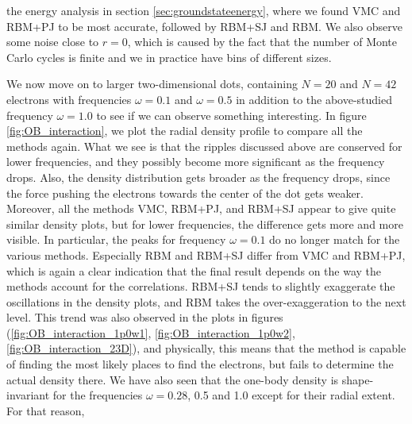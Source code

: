 \noindent
the energy analysis in section \ref{sec:groundstateenergy}, where we found VMC and RBM+PJ to be most accurate, followed by RBM+SJ and RBM. We also observe some noise close to $r=0$, which is caused by the fact that the number of Monte Carlo cycles is finite and we in practice have bins of different sizes.

We now move on to larger two-dimensional dots, containing $N=20$ and $N=42$ electrons with frequencies $\omega=0.1$ and $\omega=0.5$ in addition to the above-studied frequency $\omega=1.0$ to see if we can observe something interesting. In figure \eqref{fig:OB_interaction}, we plot the radial density profile to compare all the methods again. What we see is that the ripples discussed above are conserved for lower frequencies, and they possibly become more significant as the frequency drops. Also, the density distribution gets broader as the frequency drops, since the force pushing the electrons towards the center of the dot gets weaker. Moreover, all the methods VMC, RBM+PJ, and RBM+SJ appear to give quite similar density plots, but for lower frequencies, the difference gets more and more visible. In particular, the peaks for frequency $\omega=0.1$ do no longer match for the various methods. Especially RBM and RBM+SJ differ from VMC and RBM+PJ, which is again a clear indication that the final result depends on the way the methods account for the correlations. RBM+SJ tends to slightly exaggerate the oscillations in the density plots, and RBM takes the over-exaggeration to the next level. This trend was also observed in the plots in figures (\ref{fig:OB_interaction_1p0w1}, \ref{fig:OB_interaction_1p0w2}, \ref{fig:OB_interaction_23D}), and physically, this means that the method is capable of finding the most likely places to find the electrons, but fails to determine the actual density there. We have also seen that the one-body density is shape-invariant for the frequencies $\omega=0.28$, 0.5 and 1.0 except for their radial extent. For that reason, 

